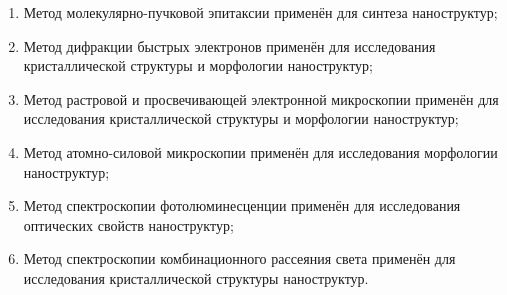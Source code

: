 {\methods}
\begin{enumerate}[beginpenalty=10000]
  \item Метод молекулярно-пучковой эпитаксии применён для синтеза наноструктур;
  \item Метод дифракции быстрых электронов применён для исследования кристаллической структуры и морфологии наноструктур;
  \item Метод растровой и просвечивающей электронной микроскопии применён для исследования кристаллической структуры и морфологии наноструктур;
  \item Метод атомно-силовой микроскопии применён для исследования морфологии наноструктур;
  \item Метод спектроскопии фотолюминесценции применён для исследования оптических свойств наноструктур;
  \item Метод спектроскопии комбинационного рассеяния света применён для исследования кристаллической структуры наноструктур.
\end{enumerate}

